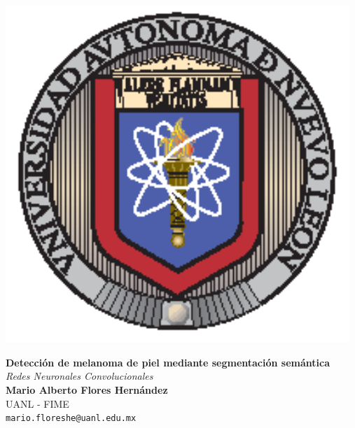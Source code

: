 \documentclass[a0,portrait]{a0poster}
\begin{document}
\begin{minipage}[b]{0.20\linewidth}
    \begin{center}
        \includegraphics[width=13cm]{uanl.eps}\\
        \vspace{5.5cm}
    \end{center}
\end{minipage}
%
\begin{minipage}[b]{0.60\linewidth}
    \begin{center}
        \veryHuge \color{Black} \textbf{Detección de melanoma de piel mediante segmentación semántica} \color{Black} \\[0.5cm]
        \Huge \textit{Redes Neuronales Convolucionales}\\[2cm]
        \LARGE \textbf{Mario Alberto Flores Hernández}\\[0.5cm]
        \huge UANL - FIME \\[0.5cm]
        \Large \texttt{mario.floreshe@uanl.edu.mx}
    \end{center}
\end{minipage}
%
\end{document}
